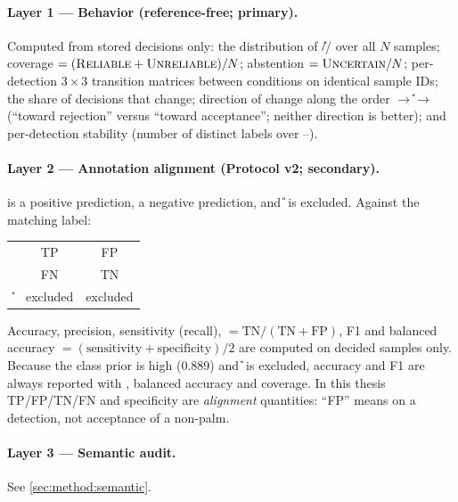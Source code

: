 \paragraph{Layer 1 — Behavior (reference-free; primary).} Computed from stored
decisions only: the distribution of \R{}/\U{}/\Ur{} over all $N$ samples;
coverage $=(\textsc{Reliable}+\textsc{Unreliable})/N$; abstention $=\textsc{Uncertain}/N$; per-detection $3\times3$ transition
matrices between conditions on identical sample IDs; the share of decisions that
change; direction of change along the order
\R{}$\rightarrow$\U{}$\rightarrow$\Ur{} (``toward rejection'' versus ``toward
acceptance''; neither direction is better); and per-detection stability (number
of distinct labels over --).

\paragraph{Layer 2 — Annotation alignment (Protocol v2; secondary).} \R{} is a
positive prediction, \Ur{} a negative prediction, and \U{} is excluded. Against
the matching label:
\begin{center}
\small
\begin{tabular}{lcc}
  \toprule
  & \matched{} & \unmatched{} \\
  \midrule
  \R{}  & TP & FP \\
  \Ur{} & FN & TN \\
  \U{}  & excluded & excluded \\
  \bottomrule
\end{tabular}
\end{center}
Accuracy, precision, sensitivity (recall), \alignspec{} $=\mathrm{TN}/(\mathrm{TN}+\mathrm{FP})$,
F1 and balanced accuracy $=(\text{sensitivity}+\text{specificity})/2$ are
computed on decided samples only. Because the class prior is high (0.889) and
\U{} is excluded, accuracy and F1 are always reported with \alignspec{},
balanced accuracy and coverage. In this thesis TP/FP/TN/FN and
specificity are \emph{alignment} quantities: ``FP'' means \R{} on a
\unmatched{} detection, not acceptance of a non-palm.

\paragraph{Layer 3 — Semantic audit.} See \cref{sec:method:semantic}.


